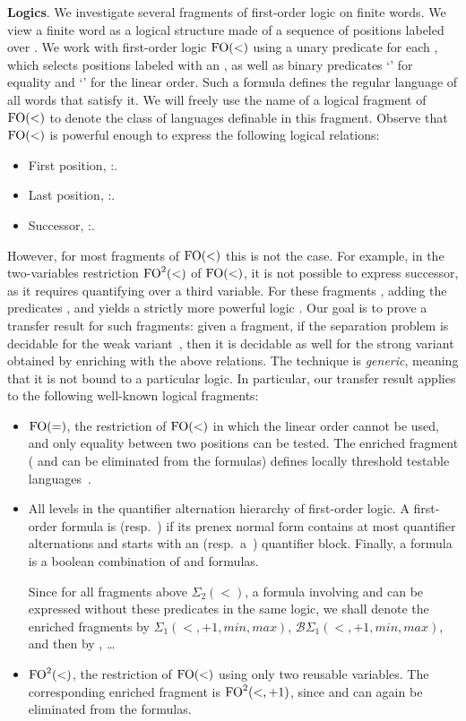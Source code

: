 \documentclass[a4paper,USenglish]{lipics}
\newcommand{\plus}{\ensuremath{+1,min,max}}
\newcommand{\sio}[1]{\ensuremath{\Sigma_{#1}(<)}\xspace}
\newcommand{\sip}[1]{\ensuremath{\Sigma_{#1}(<,\plus)}\xspace}
\newcommand{\bsp}[1]{\ensuremath{\mathcal{B}\Sigma_{#1}(<,\plus)}\xspace}
\newcommand{\sdo}{\sio{2}}
\newcommand{\fow}{\ensuremath{\textup{FO}(<)}\xspace}
\newcommand{\foeq}{\ensuremath{\textup{FO}(=)}\xspace}
\newcommand{\fod}{\ensuremath{\textup{FO}^2(<)}\xspace}
\newcommand{\fodp}{\ensuremath{\textup{FO}^2(<,+1)}\xspace}
\newcommand\highlight[1]{\par\bigskip\noindent\textbf{\sffamily #1}.}
\theoremstyle{plain}
\begin{document}
\highlight{Logics} We investigate several fragments of
first-order logic on finite words. We view a finite word as a logical
structure made of a sequence of positions labeled over . We work with
first-order logic \fow using a unary predicate  for each , which
selects positions labeled with an , as well as binary predicates `' for
equality and `' for the linear order. Such a formula defines the regular
language of all words that satisfy it. We will freely use the name of a
logical fragment of \fow to denote the class of languages definable in this
fragment. Observe that \fow is powerful enough to express the following
logical relations:
\begin{itemize}
\item First position, :.
\item Last position, :.
\item Successor, :.
\end{itemize}

However, for most fragments of \fow this is not the case. For example,
in the two-variables restriction \fod of \fow, it is not possible to
express successor, as it requires quantifying over a third
variable. For these fragments , adding the predicates ,
 and  yields a strictly more powerful logic . Our goal
is to prove a transfer result for such fragments: given a fragment, if
the separation problem is decidable for the weak variant~, then it
is decidable as well for the strong variant  obtained by
enriching  with the above relations. The technique is
\emph{generic}, meaning that it is not bound to a particular logic. In
particular, our transfer result applies to the following well-known
logical fragments:

\begin{itemize}[itemsep=1mm,topsep=1.5mm]
\item \foeq, the restriction of \fow in which the linear order cannot be used,
  and only equality between two positions can be tested. The enriched fragment
   ( and  can be eliminated from the formulas) defines locally threshold
  testable languages~\cite{Thom82}.

\item All levels in the quantifier alternation hierarchy of
  first-order logic. A first-order formula is  (resp.~) if
  its prenex normal form contains at most  quantifier
  alternations and starts with an  (resp.~a~)
  quantifier block. Finally, a  formula is a boolean combination of
   and  formulas.

  Since for all fragments above \sdo, a formula involving  and  can be
  expressed without these predicates in the same logic, we shall denote the enriched fragments
  by {\sip 1}, \mbox{{\bsp 1}}, and then by , \dots

\item \fod, the restriction of \fow using only two reusable
  variables. The corresponding enriched fragment is \fodp, since
   and  can again be eliminated from the formulas.
\end{itemize}
\end{document}
